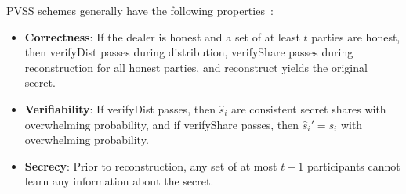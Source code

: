 PVSS schemes generally have the following properties~\cite{pvss_pairings_heidervand}:
\begin{itemize}
    \item \textbf{Correctness}:
    If the dealer is honest and a set of at least $t$ parties are honest, then \textsf{verifyDist} passes during distribution, \textsf{verifyShare} passes during reconstruction for all honest parties, and \textsf{reconstruct} yields the original secret.
    \item \textbf{Verifiability}:
    If \textsf{verifyDist} passes, then $\hat{s}_i$ are consistent secret shares with overwhelming probability, and if \textsf{verifyShare} passes, then $\hat{s}_i'= s_i$ with overwhelming probability.
    \item \textbf{Secrecy}:
    Prior to reconstruction, any set of at most $t - 1$ participants cannot learn any information about the secret.
\end{itemize}